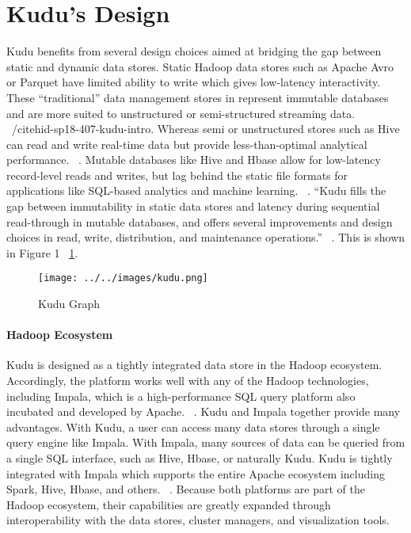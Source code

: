 \section{Kudu's Design}
Kudu benefits from several design choices aimed at bridging the gap between static and dynamic data stores. Static Hadoop data stores such as Apache Avro or Parquet have limited ability to write which gives low-latency interactivity. These ``traditional'' data management stores in represent immutable databases and are more suited to unstructured or semi-structured streaming data. ~/cite{hid-sp18-407-kudu-intro}. Whereas semi or unstructured stores such as Hive can read and write real-time data but provide less-than-optimal analytical performance. ~\cite{hid-sp18-407-impala-intro}. Mutable databases like Hive and Hbase allow for low-latency record-level reads and writes, but lag behind the static file formats for applications like SQL-based analytics and machine learning. ~\cite{hid-sp18-407-kudu-impala-integration}. ``Kudu fills the gap between immutability in static data stores and latency during sequential read-through in mutable databases, and offers several improvements and design choices in read, write, distribution, and maintenance operations.'' ~\cite{hid-sp18-407-impala-intro}. This is shown in Figure 1 ~\ref{f:kudu}. 

\begin{figure}[!ht]
  \centering\texttt{[image: ../../images/kudu.png]}
  \caption{Kudu Graph}\label{f:kudu}
\end{figure}

\paragraph{Hadoop Ecosystem}
Kudu is designed as a tightly integrated data store in the Hadoop ecosystem. Accordingly, the platform works well with any of the Hadoop technologies, including Impala, which is a high-performance SQL query platform also incubated and developed by Apache. ~\cite{hid-sp18-407-impala-intro}. Kudu and Impala together provide many advantages. With Kudu, a user can access many data stores through a single query engine like Impala. With Impala, many sources of data can be queried from a single SQL interface, such as Hive, Hbase, or naturally Kudu. Kudu is tightly integrated with Impala which supports the entire Apache ecosystem including Spark, Hive, Hbase, and others. ~\cite{hid-sp18-407-benchmarking-kudu}. Because both platforms are part of the Hadoop ecosystem, their capabilities are greatly expanded through interoperability with the data stores, cluster managers, and visualization tools.

